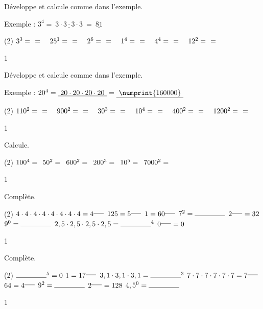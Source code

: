 \documentclass[a4paper,11pt]{report}
\begin{document}
\begin{exop}{
Développe et calcule comme dans l'exemple.

Exemple : $3^4=\underline{~3\cdot3\cdot3\cdot3~}=\underline{~81~}$
\begin{tasks}(2)
    \task $3^3=~\hrulefill~=$ ~
    \task $25^1=~\hrulefill~=$ ~
    \task $2^6=~\hrulefill~=$ ~
    \task $1^4=~\hrulefill~=$ ~
    \task $4^4=~\hrulefill~=$ ~
    \task $12^2=~\hrulefill~=$ ~
\end{tasks}
}{1}
\end{exop}

\begin{exop}{
Développe et calcule comme dans l'exemple.

Exemple : $20^4=\underline{~20\cdot20\cdot20\cdot20~}=\underline{~\numprint{160000}~}$
\begin{tasks}(2)
    \task $110^2=~\hrulefill~=$ ~
    \task $900^2=~\hrulefill~=$ ~
    \task $30^3=~\hrulefill~=$ ~
    \task $10^4=~\hrulefill~=$ ~
    \task $400^2=~\hrulefill~=$ ~
    \task $1200^2=~\hrulefill~=$ ~
\end{tasks}
}{1}
\end{exop}

\begin{exop}{
Calcule.

\begin{tasks}(2)
    \task $100^4=~\hrulefill$
    \task $50^2=~\hrulefill$
    \task $600^2=~\hrulefill$
    \task $200^3=~\hrulefill$
    \task $10^5=~\hrulefill$
    \task $7000^2=~\hrulefill$
\end{tasks}
}{1}
\end{exop}

\begin{exop}{
Complète.
\begin{tasks}(2)
    \task $4\cdot4\cdot4\cdot4\cdot4\cdot4\cdot4\cdot4=4^{\ligne{0.5}}$
    \task $125=5^{\ligne{0.5}}$
    \task $1=60^{\ligne{0.5}}$
    \task $7^2=\ligne{1.5}$
    \task $2^{\ligne{0.5}}=32$
    \task $9^0=\ligne{1.5}$
    \task $2,5\cdot2,5\cdot2,5\cdot2,5=\ligne{1.5}^4$
    \task $0^{\ligne{0.5}}=0$
\end{tasks}
}{1}
\end{exop}

\begin{exop}{
Complète.
\begin{tasks}(2)
    \task $\ligne{1.5}^5=0$
    \task $1=17^{\ligne{0.5}}$
    \task $3,1\cdot3,1\cdot3,1=\ligne{1.5}^3$
    \task $7\cdot7\cdot7\cdot7\cdot7\cdot7=7^{\ligne{0.5}}$
    \task $64=4^{\ligne{0.5}}$
    \task $9^2=\ligne{1.5}$
    \task $2^{\ligne{0.5}}=128$
    \task $4,5^0=\ligne{1.5}$    
\end{tasks}
}{1}
\end{exop}
\end{document}

